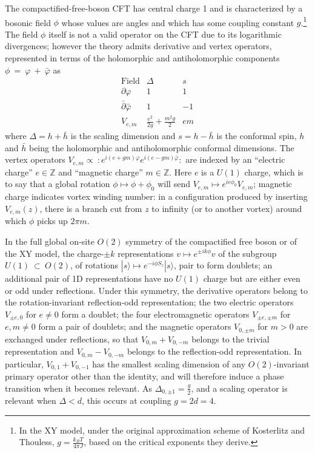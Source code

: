 \documentclass[aps,prb,letterpaper,superscriptaddress,twocolumn,showpacs,floatfix,10pt]{revtex4-1}
\begin{document}
The compactified-free-boson CFT has central charge 1 and
is characterized by a bosonic field $\phi$ whose values are angles and which
has some coupling constant $g$.\footnote{In the XY model, under the original
approximation scheme of Kosterlitz and Thouless\cite{Kosterlitz},
$g = \frac{k_BT}{4\pi J}$, based on the critical exponents they derive.}
The field $\phi$ itself is not a valid operator on the CFT due to its
logarithmic
divergences; however the theory admits derivative and vertex operators,
represented in terms of the holomorphic and antiholomorphic components
$\phi~=~\varphi~+~\bar\varphi$ as
\begin{equation}
\begin{array}{c|c|c}
\text{Field}&\Delta&s\\\hline
\partial\varphi&1&1\\
\bar\partial\bar\varphi&1&-1\\
V_{e,m}&\frac{e^2}{2g} + \frac{m^2g}{2}&em
\end{array}
\end{equation}
where $\Delta = h+\bar{h}$ is the scaling dimension and $s=h-\bar{h}$ is the 
conformal spin, $h$ and $\bar{h}$ being the holomorphic and antiholomorphic
conformal dimensions. The vertex operators $V_{e,m} \propto \  :\mathrel{e^{i(e+gm)\varphi}e^{i(e-gm)\bar\varphi}}:$ are indexed by an
``electric charge'' $e \in \mathbb{Z}$ and ``magnetic charge'' $m\in\mathbb{Z}$.
Here $e$ is a $U(1)$ charge, which is to say that a global rotation
$\phi \mapsto \phi+\phi_0$
will send $V_{e,m}\mapsto e^{ie\phi_0}V_{e,m}$; magnetic charge indicates
vortex winding number: in a configuration produced by inserting
$V_{e,m}(z)$, there is a branch cut from $z$ to infinity (or to another vortex)
around which $\phi$ picks up $2\pi m$.

In the full global on-site $O(2)$ symmetry of the compactified free boson or of
the XY model, the charge-$\pm k$ representations
$v \mapsto e^{\pm i k\phi}v$
of the subgroup $U(1)~\subset~O(2)$, of rotations
$|s\rangle \mapsto e^{-i \phi S_z}|s\rangle$, pair to form
doublets; an additional pair of 1D representations have no $U(1)$ charge but
are either even or odd under reflections. Under this symmetry, the derivative
operators belong to the rotation-invariant reflection-odd representation;
the two electric operators $V_{\pm e,0}$ for $e \neq 0$ form a doublet; the four
electromagnetic operators $V_{\pm e, \pm m}$ for $e,m \neq 0$ form a pair of
doublets; and the magnetic operators $V_{0,\pm m}$ for $m > 0$ are exchanged
under reflections, so that $V_{0,m}+V_{0,-m}$ belongs to the
trivial representation and $V_{0,m}-V_{0,-m}$ belongs to the
reflection-odd representation. In particular, $V_{0,1}+V_{0,-1}$
has the smallest scaling dimension of any
$O(2)$-invariant primary operator other than the identity, and will therefore
induce a phase transition when it becomes relevant. As
$\Delta_{0,\pm 1}=\frac{g}{2}$, and a scaling operator is relevant
when $\Delta < d$, this occurs at coupling $g=2d=4$.
\end{document}
